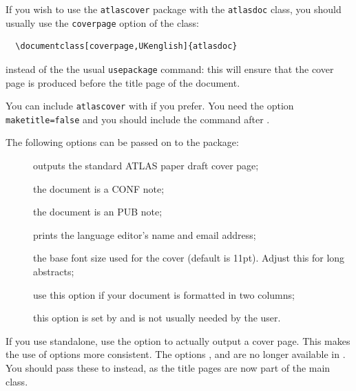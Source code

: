 If you wish to use the \texttt{atlascover} package with the 
\texttt{atlasdoc} class, you should usually use the \texttt{coverpage} option of the class:
\begin{verbatim}
  \documentclass[coverpage,UKenglish]{atlasdoc}
\end{verbatim}
instead of the the usual \texttt{usepackage} command: this will ensure
that the cover page is produced before the title page of the document.

 You can include \texttt{atlascover} with  if you prefer.
 You need the option \texttt{maketitle=false}
and you should include the  command after \verb||.

The following options can be passed on to the  package:
\begin{description}
\item[] outputs the standard ATLAS paper draft cover page;
\item[] the document is a CONF note;
\item[] the document is an PUB note;
\item[] prints the language editor's name and email address;
\item[] the base font size used for the cover (default is 11pt). Adjust this for long abstracts;
\item[] use this option if your document is formatted in two columns;
\item[] this option is set by  and is not usually needed by the user.
\end{description}

 If you use  standalone, use the option  to
actually output a cover page. 
This makes the use of options more consistent.
 The options , 
and  are no longer available in .
You should pass these to  instead, as the title pages are now part of the main class.

